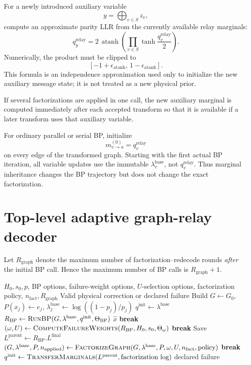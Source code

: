 \documentclass[11pt,a4paper]{article}
\begin{document}
For a newly introduced auxiliary variable
\[
y=\bigoplus_{v\in S}z_v,
\]
compute an approximate parity LLR from the currently available relay marginals:
\[
\boxed{
q_y^{\mathrm{relay}}
=
2\,\operatorname{atanh}
\left(
\prod_{v\in S}
\tanh\frac{q_v^{\mathrm{relay}}}{2}
\right).
}
\]
Numerically, the product must be clipped to
\[
[-1+\epsilon_{\mathrm{atanh}},\,1-\epsilon_{\mathrm{atanh}}].
\]
This formula is an independence approximation used only to initialize the new
auxiliary message state; it is not treated as a new physical prior.

If several factorizations are applied in one call, the new auxiliary marginal
is computed immediately after each accepted transform so that it is available
if a later transform uses that auxiliary variable.

For ordinary parallel or serial BP, initialize
\[
m_{v\to a}^{(0)}
=
q_v^{\mathrm{relay}}
\]
on every edge of the transformed graph. Starting with the first actual BP
iteration, all variable updates use the immutable $\lambda_v^{\mathrm{base}}$,
not $q_v^{\mathrm{relay}}$. Thus marginal inheritance changes the BP trajectory
but does not change the exact factorization.

\section{Top-level adaptive graph-relay decoder}

Let $R_{\mathrm{graph}}$ denote the maximum number of
factorization--redecode rounds \emph{after} the initial BP call. Hence the
maximum number of BP calls is $R_{\mathrm{graph}}+1$.

\begin{algorithm}[H]
\caption{\textsc{AdaptiveGraphRelayDecode}}
\begin{algorithmic}[1]
\Require $H_0,s_0,p$, BP options, failure-weight options,
         $U$-selection options, factorization policy,
         $n_{\mathrm{fact}},R_{\mathrm{graph}}$
\Ensure Valid physical correction or declared failure
\State Build $G\gets G_0$, $P(x_j)\gets e_j$,
       $\lambda_j^{\mathrm{base}}\gets\log((1-p_j)/p_j)$
\State $q^{\mathrm{init}}\gets\lambda^{\mathrm{base}}$
    \State $R_{\mathrm{BP}}\gets
    \textsc{RunBP}(G,\lambda^{\mathrm{base}},q^{\mathrm{init}},\Theta_{\mathrm{BP}})$
        \State \Return $\hat x$
    \EndIf
        \State \textbf{break}
    \EndIf
    \State $(\omega,U)\gets
    \textsc{ComputeFailureWeights}(R_{\mathrm{BP}},H_0,s_0,\Theta_\omega)$
        \State \textbf{break}
    \EndIf
    \State Save $L^{\mathrm{parent}}\gets R_{\mathrm{BP}}.L^{\mathrm{final}}$
    \State $(G,\lambda^{\mathrm{base}},P,n_{\mathrm{applied}})
    \gets\textsc{FactorizeGraph}
    (G,\lambda^{\mathrm{base}},P,\omega,U,n_{\mathrm{fact}},\text{policy})$
        \State \textbf{break}
    \EndIf
    \State $q^{\mathrm{init}}\gets
    \textsc{TransferMarginals}(L^{\mathrm{parent}},\text{factorization log})$
\EndFor
\State \Return declared failure
\end{algorithmic}
\end{algorithm}
\end{document}
